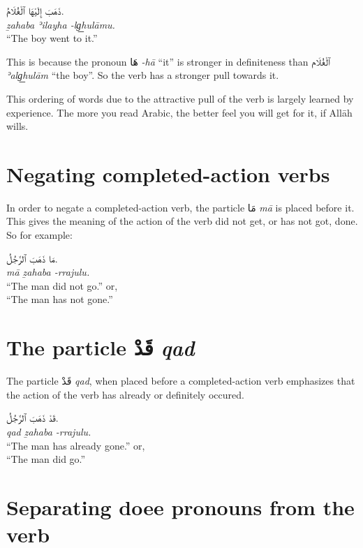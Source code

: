 \documentclass[
  10pt,
]{book}
\begin{document}
\foreignlanguage{arabic}{ذَهَبَ إِلَيْهَا ٱلْغُلَامُ.}\\
\emph{ẕahaba ʾilayha -lg͟hulāmu.}\\
\enquote{The boy went to it.}

This is because the pronoun \foreignlanguage{arabic}{هَا} \emph{-hā} \enquote{it} is stronger in definiteness than \foreignlanguage{arabic}{ٱلْغُلَام} \emph{ʾalg͟hulām} \enquote{the boy}. So the verb has a stronger pull towards it.

This ordering of words due to the attractive pull of the verb is largely learned by experience. The more you read Arabic, the better feel you will get for it, if Allāh wills.

\section{Negating completed-action verbs}\label{negating-completed-action-verbs}

In order to negate a completed-action verb, the particle \foreignlanguage{arabic}{مَا} \emph{mā} is placed before it. This gives the meaning of the action of the verb did not get, or has not got, done. So for example:

\foreignlanguage{arabic}{مَا ذَهَبَ ٱلرَّجُلُ.}\\
\emph{mā ẕahaba -rrajulu.}\\
\enquote{The man did not go.} or,\\
\enquote{The man has not gone.}

\section{\texorpdfstring{The particle \foreignlanguage{arabic}{قَدْ} \emph{qad}}{The particle قَدْ qad}}\label{the-particle-ux642ux62f-qad}

The particle \foreignlanguage{arabic}{قَدْ} \emph{qad}, when placed before a completed-action verb emphasizes that the action of the verb has already or definitely occured.

\foreignlanguage{arabic}{قَدْ ذَهَبَ ٱلرَّجُلُ.}\\
\emph{qad ẕahaba -rrajulu.}\\
\enquote{The man has already gone.} or,\\
\enquote{The man did go.}

\section{Separating doee pronouns from the verb}\label{separating-doee-pronouns-from-the-verb}
\end{document}

